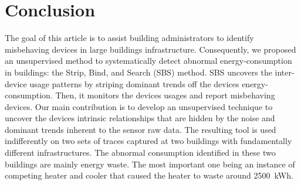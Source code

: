 \section{Conclusion}
The goal of this article is to assist building administrators to identify misbehaving devices in large buildings infrastructure.
Consequently, we proposed an unsupervised method to systematically detect abnormal energy-consumption in buildings: the Strip, Bind, and Search (SBS) method.
SBS uncovers the inter-device usage patterns by striping dominant trends off the devices energy-consumption.
Then, it monitors the devices usages and report misbehaving devices.
Our main contribution is to develop an unsupervised technique to uncover the devices intrinsic relationships that are hidden by the noise and dominant trends inherent to the sensor raw data.
The resulting tool is used indifferently on two sets of traces captured at two buildings with fundamentally different infrastructures.
The abnormal consumption identified in these two buildings are mainly energy waste.
The most important one being an instance of competing heater and cooler that caused the heater to waste around 2500~kWh.



